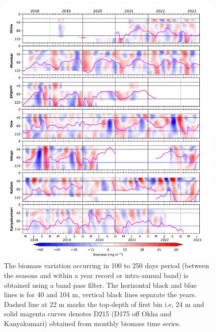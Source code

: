 \documentclass[authoryear,review,12pt]{elsarticle}
\begin{document}
\begin{figure}[htbp]
	\centering
	\includegraphics[width=\textwidth]{./figures/intraannual_100_250_351.jpeg} 
	\captionsetup{justification=justified,font=footnotesize,skip=0.05\baselineskip,width=\textwidth}
	\caption{The biomass variation occurring in 100 to 250 days period (between the seasons and within a year record or intra-annual band) is obtained using a band pass filter. The horizontal black and blue lines is for 40 and 104 m, vertical black lines separate the years. Dashed line at 22 m marks the top-depth of first bin i.e, 24 m and solid magenta curves denotes D215 (D175 off Okha and Kanyakumari) obtained from monthly biomass time series. }
	\label{fig:intraannual}
\end{figure}
\end{document}
